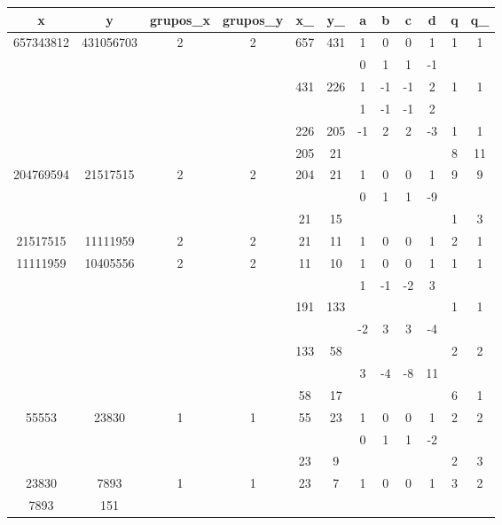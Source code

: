 \begin{center}
\begin{sideways}
\begin{tabular}{|c|c|c|c|c|c|c|c|c|c|c|c|}
\hline
x&y&grupos\_x&grupos\_y&x\_&y\_&a&b&c&d&q&q\_ \\ \hline
657343812&431056703&2&2&657&431&1&0­&0&1&1&1 \\ \hline
& & & & & & 0&  1& 1& -1& & \\ \hline
& & & & 431& 226& 1& -1& -1& 2& 1& 1 \\ \hline
& & & & & & 1& -1& -1& 2& & \\ \hline
& & & & 226& 205& -1& 2& 2& -3& 1& 1 \\\hline
& & & & 205& 21& & & & & 8& 11 \\\hline
204769594& 21517515& 2& 2& 204& 21& 1& 0& 0& 1& 9& 9 \\\hline
& & & & & & 0& 1& 1& -9& & \\\hline
& & & & 21& 15& & & & & 1& 3 \\\hline
21517515& 11111959& 2& 2& 21& 11& 1& 0& 0& 1& 2& 1 \\\hline
11111959& 10405556& 2& 2& 11& 10& 1& 0& 0& 1& 1& 1 \\\hline
&&&&&&1&-1&-2&3&&\\\hline
&&&&191&133&&&&&1&1\\\hline
&&&&&&-2&3&3&-4&&\\\hline
&&&&133&58&&&&&2&2\\\hline
&&&&&&3&-4&-8&11&&\\\hline
&&&&58&17&&&&&6&1\\\hline
55553&23830&1&1&55&23&1&0&0&1&2&2\\\hline
&&&&&&0&1&1&-2&&\\\hline
&&&&23&9&&&&&2&3\\\hline
23830&7893&1&1&23&7&1&0&0&1&3&2\\\hline
7893&151&&&&&&&&&&\\\hline
\end{tabular}
\end{sideways}
\end{center}

  
    
      
      
      
      
    
      

